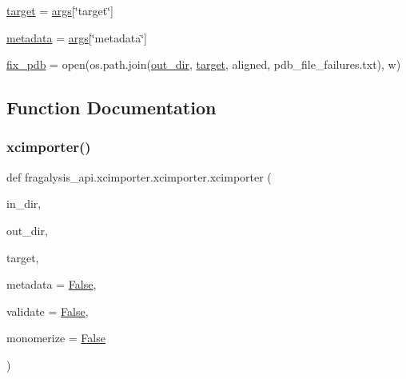 \begin{DoxyCompactItemize}
\item 
\hyperlink{namespacefragalysis__api_1_1xcimporter_1_1xcimporter_a2c93b8722226ac96f6668b2fc07515e8}{target} = \hyperlink{namespacefragalysis__api_1_1xcimporter_1_1xcimporter_a3ad0db7b1c2c8a00d4963bf5f7dd21bc}{args}\mbox{[}\char`\"{}target\char`\"{}\mbox{]}
\item 
\hyperlink{namespacefragalysis__api_1_1xcimporter_1_1xcimporter_a3414d616d16bdcc9b7bbfd56591a406d}{metadata} = \hyperlink{namespacefragalysis__api_1_1xcimporter_1_1xcimporter_a3ad0db7b1c2c8a00d4963bf5f7dd21bc}{args}\mbox{[}\char`\"{}metadata\char`\"{}\mbox{]}
\item 
\hyperlink{namespacefragalysis__api_1_1xcimporter_1_1xcimporter_abbbe817fae311228915dac1ff528045e}{fix\+\_\+pdb} = open(os.\+path.\+join(\hyperlink{namespacefragalysis__api_1_1xcimporter_1_1xcimporter_a48b550a7c1c2ca499d6f204c133ae41d}{out\+\_\+dir}, \hyperlink{namespacefragalysis__api_1_1xcimporter_1_1xcimporter_a2c93b8722226ac96f6668b2fc07515e8}{target}, \textquotesingle{}aligned\textquotesingle{}, \textquotesingle{}pdb\+\_\+file\+\_\+failures.\+txt\textquotesingle{}), \textquotesingle{}w\textquotesingle{})
\end{DoxyCompactItemize}


\subsection{Function Documentation}
\mbox{\label{namespacefragalysis__api_1_1xcimporter_1_1xcimporter_a673f390dc6b7d0062ec8d9510079dded}} 
\subsubsection{\texorpdfstring{xcimporter()}{xcimporter()}}
{\footnotesize\ttfamily def fragalysis\+\_\+api.\+xcimporter.\+xcimporter.\+xcimporter (\begin{DoxyParamCaption}\item[{}]{in\+\_\+dir,  }\item[{}]{out\+\_\+dir,  }\item[{}]{target,  }\item[{}]{metadata = {\ttfamily \hyperlink{namespacefragalysis__api_1_1xcimporter_1_1xcimporter_a7b54c2ad280b13dc0833892106613e4c}{False}},  }\item[{}]{validate = {\ttfamily \hyperlink{namespacefragalysis__api_1_1xcimporter_1_1xcimporter_a7b54c2ad280b13dc0833892106613e4c}{False}},  }\item[{}]{monomerize = {\ttfamily \hyperlink{namespacefragalysis__api_1_1xcimporter_1_1xcimporter_a7b54c2ad280b13dc0833892106613e4c}{False}} }\end{DoxyParamCaption})}



